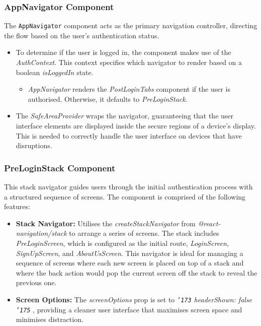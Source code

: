 \subsubsection{AppNavigator Component}

The \texttt{AppNavigator} component acts as the primary navigation controller, directing the flow based on the user's authentication status.

\begin{itemize}
    \item To determine if the user is logged in, the component makes use of the \textit{AuthContext}. This context specifies which navigator to render based on a boolean \textit{isLoggedIn} state.
    \begin{itemize}
        \item \textit{AppNavigator} renders the \textit{PostLoginTabs} component if the user is authorised. Otherwise, it defaults to \textit{PreLoginStack}.
    \end{itemize}
    \item The \textit{SafeAreaProvider} wraps the navigator, guaranteeing that the user interface elements are displayed inside the secure regions of a device's display. This is needed to correctly handle the user interface on devices that have disruptions.
\end{itemize}

\subsubsection{PreLoginStack Component}

This stack navigator guides users through the initial authentication process with a structured sequence of screens. The component is comprised of the following features:

\begin{itemize}
    \item \textbf{Stack Navigator:} Utilises the \textit{createStackNavigator} from \textit{@react-navigation/stack} to arrange a series of screens. The stack includes \textit{PreLoginScreen}, which is configured as the initial route, \textit{LoginScreen}, \textit{SignUpScreen}, and \textit{AboutUsScreen}. This navigator is ideal for managing a sequence of screens where each new screen is placed on top of a stack and where the back action would pop the current screen off the stack to reveal the previous one.    
    \item \textbf{Screen Options:} The \textit{screenOptions} prop is set to \textit{ {\tt {\char '173}} headerShown: false {\tt {\char '175}} }, providing a cleaner user interface that maximises screen space and minimises distraction.
\end{itemize}

